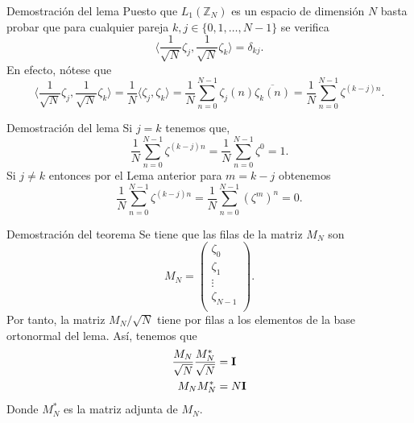 \documentclass[11pt,compress]{beamer}
\newcommand\Z{\mathbb{Z}}
\begin{document}
\begin{frame}
\begin{block}{Demostración del lema}
  Puesto que $L_1(\Z_N)$ es un espacio de dimensión $N$ basta probar que para cualquier pareja $k,j \in \{0,1,\ldots,N-1\}$ se verifica
  \[
  \langle \frac{1}{\sqrt{N}} \zeta_j,\frac{1}{\sqrt{N}} \zeta_k\rangle=\delta_{kj}.
  \]
  En efecto, nótese que
  \[
  \langle \frac{1}{\sqrt{N}} \zeta_j,\frac{1}{\sqrt{N}} \zeta_k\rangle=\frac{1}{N}\langle \zeta_j, \zeta_k\rangle=\frac{1}{N}\sum_{n=0}^{N-1} \zeta_j(n)\overline{ \zeta_k(n)}=\frac{1}{N}\sum_{n=0}^{N-1} \zeta^{(k-j)n}.
  \]
\end{block}
\end{frame}

\begin{frame}
\begin{block}{Demostración del lema}
  Si $j=k$ tenemos que,
  \[\frac{1}{N}\sum_{n=0}^{N-1} \zeta^{(k-j)n}=\frac{1}{N}\sum_{n=0}^{N-1} \zeta^{0}=1.\]
  Si $j\neq k$ entonces por el Lema anterior para $m=k-j$ obtenemos
  \[\frac{1}{N}\sum_{n=0}^{N-1}\zeta^{(k-j)n}=\frac{1}{N}\sum_{n=0}^{N-1}\left(\zeta^m\right)^n=0. \]
\end{block}
\end{frame}

\begin{frame}
\begin{block}{Demostración del teorema}
Se tiene que las filas de la matriz $M_N$ son
\[
    M_{N} = \begin{pmatrix}
     \zeta_0 \\
     \zeta_1 \\
    \vdots \\
     \zeta_{N-1} \\
    \end{pmatrix}.
\]
Por tanto, la matriz $M_N / \sqrt{N}$ tiene por filas a los elementos de la base ortonormal del lema. Así, tenemos que
\begin{align*}
    \frac{M_N}{\sqrt{N}} \frac{M_N^{\ast}}{\sqrt{N}} &= {\bf I} \\
    M_N M_N^{\ast} &= N{\bf I}
\end{align*}
Donde $M_N^{\ast}$ es la matriz adjunta de $M_N$.
\end{block}
\end{frame}

\end{document}
